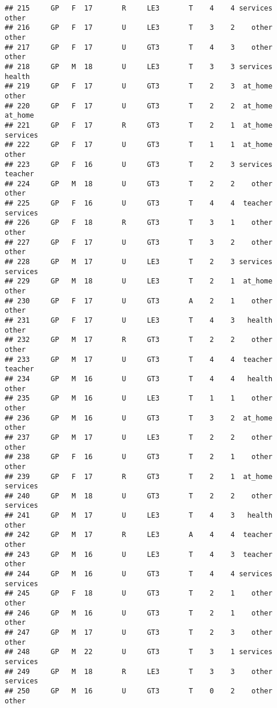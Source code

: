 \documentclass[
]{article}
\begin{document}
\begin{verbatim}
## 215     GP   F  17       R     LE3       T    4    4 services    other
## 216     GP   F  17       U     LE3       T    3    2    other    other
## 217     GP   F  17       U     GT3       T    4    3    other    other
## 218     GP   M  18       U     LE3       T    3    3 services   health
## 219     GP   F  17       U     GT3       T    2    3  at_home    other
## 220     GP   F  17       U     GT3       T    2    2  at_home  at_home
## 221     GP   F  17       R     GT3       T    2    1  at_home services
## 222     GP   F  17       U     GT3       T    1    1  at_home    other
## 223     GP   F  16       U     GT3       T    2    3 services  teacher
## 224     GP   M  18       U     GT3       T    2    2    other    other
## 225     GP   F  16       U     GT3       T    4    4  teacher services
## 226     GP   F  18       R     GT3       T    3    1    other    other
## 227     GP   F  17       U     GT3       T    3    2    other    other
## 228     GP   M  17       U     LE3       T    2    3 services services
## 229     GP   M  18       U     LE3       T    2    1  at_home    other
## 230     GP   F  17       U     GT3       A    2    1    other    other
## 231     GP   F  17       U     LE3       T    4    3   health    other
## 232     GP   M  17       R     GT3       T    2    2    other    other
## 233     GP   M  17       U     GT3       T    4    4  teacher  teacher
## 234     GP   M  16       U     GT3       T    4    4   health    other
## 235     GP   M  16       U     LE3       T    1    1    other    other
## 236     GP   M  16       U     GT3       T    3    2  at_home    other
## 237     GP   M  17       U     LE3       T    2    2    other    other
## 238     GP   F  16       U     GT3       T    2    1    other    other
## 239     GP   F  17       R     GT3       T    2    1  at_home services
## 240     GP   M  18       U     GT3       T    2    2    other services
## 241     GP   M  17       U     LE3       T    4    3   health    other
## 242     GP   M  17       R     LE3       A    4    4  teacher    other
## 243     GP   M  16       U     LE3       T    4    3  teacher    other
## 244     GP   M  16       U     GT3       T    4    4 services services
## 245     GP   F  18       U     GT3       T    2    1    other    other
## 246     GP   M  16       U     GT3       T    2    1    other    other
## 247     GP   M  17       U     GT3       T    2    3    other    other
## 248     GP   M  22       U     GT3       T    3    1 services services
## 249     GP   M  18       R     LE3       T    3    3    other services
## 250     GP   M  16       U     GT3       T    0    2    other    other

\end{verbatim}
\end{document}
